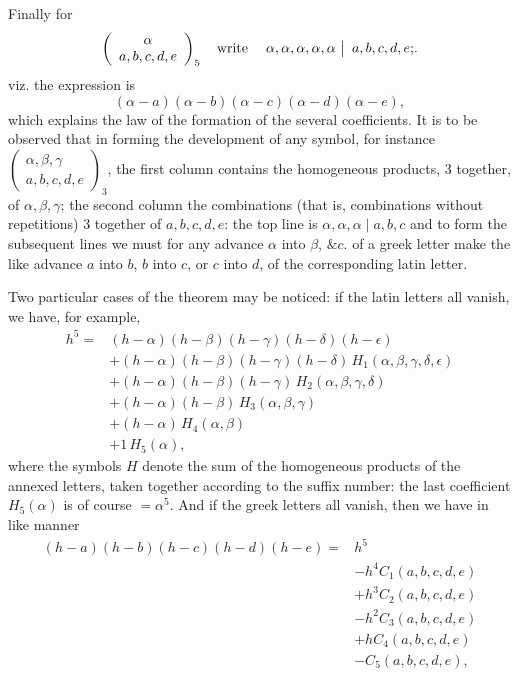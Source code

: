 \documentclass[11pt,a4paper]{article}
\makeatletter
\theoremstyle{plain}
\theoremstyle{definition}
\newcommand{\eps}{\epsilon}
\newcommand{\amp}{\&c.}
\newcommand{\twocol}[2]{%
  \left.
  \begin{array}{@{}l@{}}
    #1
  \end{array}
  \ \right|\
  \begin{array}{@{}l@{}}
    #2
  \end{array}}
\makeatother
\begin{document}
Finally for
\[
\left(\begin{array}{c}
\alpha\\
a,b,c,d,e
\end{array}\right)_{5}
\quad\text{write}\quad
\twocol{\alpha,\alpha,\alpha,\alpha,\alpha}{a,b,c,d,e;}.
\]
viz. the expression is
\[
(\alpha-a)(\alpha-b)(\alpha-c)(\alpha-d)(\alpha-e),
\]
which explains the law of the formation of the several coefficients. It is to be observed
that in forming the development of any symbol, for instance
\(\left(\begin{array}{c}\alpha,\beta,\gamma\\ a,b,c,d,e\end{array}\right)_{3}\),
the first column contains the homogeneous products, 3 together, of \(\alpha,\beta,\gamma\);
the second column the combinations (that is, combinations without repetitions) 3 together
of \(a,b,c,d,e\): the top line is \(\alpha,\alpha,\alpha\mid a,b,c\) and to form the
subsequent lines we must for any advance \(\alpha\) into \(\beta\), \(\amp\) of a greek
letter make the like advance \(a\) into \(b\), \(b\) into \(c\), or \(c\) into \(d\), of the
corresponding latin letter.

Two particular cases of the theorem may be noticed: if the latin letters all vanish,
we have, for example,
\[
\begin{aligned}
h^{5}={}&(h-\alpha)(h-\beta)(h-\gamma)(h-\delta)(h-\eps)\\
&+(h-\alpha)(h-\beta)(h-\gamma)(h-\delta)\,H_{1}(\alpha,\beta,\gamma,\delta,\eps)\\
&+(h-\alpha)(h-\beta)(h-\gamma)\,H_{2}(\alpha,\beta,\gamma,\delta)\\
&+(h-\alpha)(h-\beta)\,H_{3}(\alpha,\beta,\gamma)\\
&+(h-\alpha)\,H_{4}(\alpha,\beta)\\
&+1\,H_{5}(\alpha),
\end{aligned}
\]
where the symbols \(H\) denote the sum of the homogeneous products of the annexed
letters, taken together according to the suffix number: the last coefficient \(H_{5}(\alpha)\)
is of course \(=\alpha^{5}\). And if the greek letters all vanish, then we have in like manner
\[
\begin{aligned}
(h-a)(h-b)(h-c)(h-d)(h-e)={}&h^{5}\\
&-h^{4}C_{1}(a,b,c,d,e)\\
&+h^{3}C_{2}(a,b,c,d,e)\\
&-h^{2}C_{3}(a,b,c,d,e)\\
&+hC_{4}(a,b,c,d,e)\\
&-C_{5}(a,b,c,d,e),
\end{aligned}
\]
\end{document}
